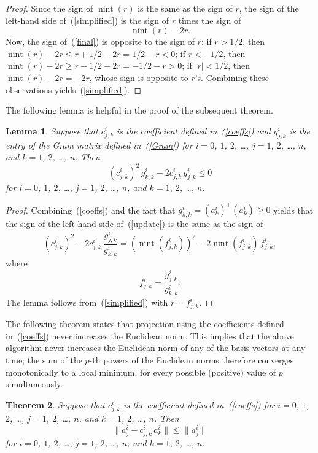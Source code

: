 \documentclass{article}
\newtheorem{theorem}{Theorem}[]
\newtheorem{lemma}[theorem]{Lemma}
\DeclareMathOperator{\nint}{nint}
\begin{document}
\begin{proof}
Since the sign of $\nint(r)$ is the same as the sign of $r$,
the sign of the left-hand side of~(\ref{simplified}) is the sign of $r$
times the sign of
%
\begin{equation}
\label{final}
\nint(r) - 2 r.
\end{equation}
%
Now, the sign of~(\ref{final}) is opposite to the sign of $r$:
if $r > 1/2$, then $\nint(r) - 2r \le r+1/2-2r = 1/2-r < 0$;
if $r < -1/2$, then $\nint(r) - 2r \ge r-1/2-2r = -1/2-r > 0$;
if $|r| < 1/2$, then $\nint(r) - 2r = -2r$, whose sign is opposite to $r$'s.
Combining these observations yields~(\ref{simplified}).
\end{proof}


The following lemma is helpful in the proof of the subsequent theorem.
%
\begin{lemma}
Suppose that $c^i_{j,k}$ is the coefficient defined in~(\ref{coeffs})
and $g^i_{j,k}$ is the entry of the Gram matrix defined in~(\ref{Gram})
for $i = 0$, $1$, $2$, \dots, $j = 1$, $2$, \dots, $n$,
and $k = 1$, $2$, \dots, $n$. Then
%
\begin{equation}
\label{update}
(c^i_{j,k})^2 \, g^i_{k,k} - 2 c^i_{j,k} \, g^i_{j,k} \le 0
\end{equation}
%
for $i = 0$, $1$, $2$, \dots, $j = 1$, $2$, \dots, $n$,
and $k = 1$, $2$, \dots, $n$.
\end{lemma}

\begin{proof}
Combining~(\ref{coeffs}) and the fact that
$g^i_{k,k} = (a^i_k)^\top (a^i_k) \ge 0$
yields that the sign of the left-hand side of~(\ref{update})
is the same as the sign of
%
\begin{equation}
(c^i_{j,k})^2 - 2 c^i_{j,k} \, \frac{g^i_{j,k}}{g^i_{k,k}}
= (\nint(f^i_{j,k}))^2 - 2 \nint(f^i_{j,k}) \, f^i_{j,k},
\end{equation}
%
where
%
\begin{equation}
f^i_{j,k} = \frac{g^i_{j,k}}{g^i_{k,k}}.
\end{equation}
%
The lemma follows from~(\ref{simplified}) with $r = f^i_{j,k}$.
\end{proof}


The following theorem states that projection using the coefficients
defined in~(\ref{coeffs}) never increases the Euclidean norm.
This implies that the above algorithm never increases the Euclidean norm
of any of the basis vectors at any time; the sum of the $p$-th powers
of the Euclidean norms therefore converges monotonically to a local minimum,
for every possible (positive) value of $p$ simultaneously.
%
\begin{theorem}
\label{theorem}
Suppose that $c^i_{j,k}$ is the coefficient defined in~(\ref{coeffs})
for $i = 0$, $1$, $2$, \dots, $j = 1$, $2$, \dots, $n$,
and $k = 1$, $2$, \dots, $n$.
Then
%
\begin{equation}
\label{mono}
\| a^i_j - c^i_{j,k} \, a^i_k \| \le \| a^i_j \|
\end{equation}
%
for $i = 0$, $1$, $2$, \dots, $j = 1$, $2$, \dots, $n$,
and $k = 1$, $2$, \dots, $n$.
\end{theorem}
\end{document}
